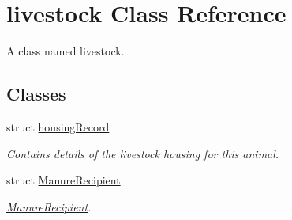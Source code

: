 \hypertarget{classlivestock}{}\section{livestock Class Reference}
\label{classlivestock}


A class named livestock.  


\subsection*{Classes}
\begin{DoxyCompactItemize}
\item 
struct \mbox{\hyperlink{structlivestock_1_1housing_record}{housing\+Record}}
\begin{DoxyCompactList}\small\item\em Contains details of the livestock housing for this animal. \end{DoxyCompactList}\item 
struct \mbox{\hyperlink{structlivestock_1_1_manure_recipient}{Manure\+Recipient}}
\begin{DoxyCompactList}\small\item\em \mbox{\hyperlink{structlivestock_1_1_manure_recipient}{Manure\+Recipient}}. \end{DoxyCompactList}\end{DoxyCompactItemize}
